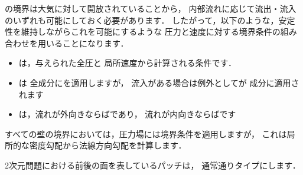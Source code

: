 の境界は大気に対して開放されていることから，
内部流れに応じて流出・流入のいずれも可能にしておく必要があります．
したがって，以下のような，安定性を維持しながらこれを可能にするような
圧力と速度に対する境界条件の組み合わせを用いることになります．
\begin{itemize}
 \item {}は，与えられた全圧と
       局所速度から計算される条件です．
 \item {}は
       全成分にを適用しますが，
       流入がある場合は例外としてが
%
       成分に適用されます
 \item {}は，流れが外向きならばであり，
       流れが内向きならばです
\end{itemize}
すべての壁の境界においては，圧力場には境界条件を適用しますが，
これは局所的な密度勾配から法線方向勾配を計算します．

2次元問題における前後の面を表しているパッチは，
通常通りタイプにします．


